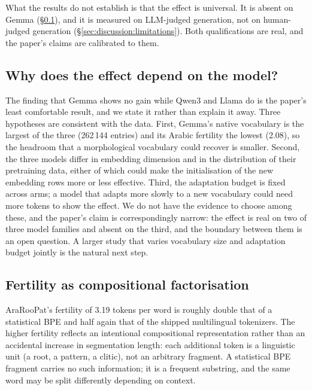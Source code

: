 \documentclass[a4paper,fleqn]{cas-sc}
\begin{document}
What the results do not establish is that the effect is universal. It is absent on Gemma (\S\ref{sec:discussion:model}), and it is measured on LLM-judged generation, not on human-judged generation (\S\ref{sec:discussion:limitations}). Both qualifications are real, and the paper's claims are calibrated to them.

\subsection{Why does the effect depend on the model?}
\label{sec:discussion:model}

The finding that Gemma shows no gain while Qwen3 and Llama do is the paper's least comfortable result, and we state it rather than explain it away. Three hypotheses are consistent with the data. First, Gemma's native vocabulary is the largest of the three (262\,144 entries) and its Arabic fertility the lowest (2.08), so the headroom that a morphological vocabulary could recover is smaller. Second, the three models differ in embedding dimension and in the distribution of their pretraining data, either of which could make the initialisation of the new embedding rows more or less effective. Third, the adaptation budget is fixed across arms; a model that adapts more slowly to a new vocabulary could need more tokens to show the effect. We do not have the evidence to choose among these, and the paper's claim is correspondingly narrow: the effect is real on two of three model families and absent on the third, and the boundary between them is an open question. A larger study that varies vocabulary size and adaptation budget jointly is the natural next step.

\subsection{Fertility as compositional factorisation}
\label{sec:discussion:fertility}

AraRooPat's fertility of 3.19 tokens per word is roughly double that of a statistical BPE and half again that of the shipped multilingual tokenizers. The higher fertility reflects an intentional compositional representation rather than an accidental increase in segmentation length: each additional token is a linguistic unit (a root, a pattern, a clitic), not an arbitrary fragment. A statistical BPE fragment carries no such information; it is a frequent substring, and the same word may be split differently depending on context.
\end{document}

